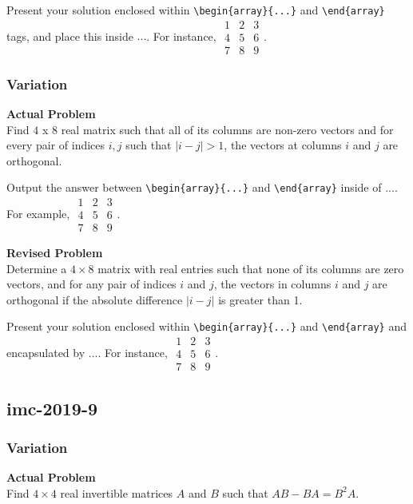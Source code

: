 Present your solution enclosed within \verb|\begin{array}{...}| and \verb|\end{array}| tags, and place this inside $\boxed{...}$. For instance, $\boxed{\begin{array}{ccc}1 & 2 & 3 \\ 4 & 5 & 6 \\ 7 & 8 & 9\end{array}}$.

\subsubsection{Variation}
\textbf{Actual Problem}\\
Find $4$ x $8$ real matrix such that all of its columns are non-zero vectors and for every pair of indices $i, j$ such that $|i - j| > 1$, the vectors at columns $i$ and $j$ are orthogonal.

Output the answer between \verb|\begin{array}{...}| and \verb|\end{array}| inside of $\boxed{...}$. For example, $\boxed{\begin{array}{ccc}1 & 2 & 3 \\ 4 & 5 & 6 \\ 7 & 8 & 9\end{array}}$.

\textbf{Revised Problem}\\
Determine a $4 \times 8$ matrix with real entries such that none of its columns are zero vectors, and for any pair of indices $i$ and $j$, the vectors in columns $i$ and $j$ are orthogonal if the absolute difference $|i - j|$ is greater than 1.

Present your solution enclosed within \verb|\begin{array}{...}| and \verb|\end{array}| and encapsulated by $\boxed{...}$. For instance, $\boxed{\begin{array}{ccc}1 & 2 & 3 \\ 4 & 5 & 6 \\ 7 & 8 & 9\end{array}}$.

\subsection{imc-2019-9}
\subsubsection{Variation}
\textbf{Actual Problem}\\
Find $4\times4$ real invertible matrices $A$ and $B$ such that $AB - BA = B^2A$.

